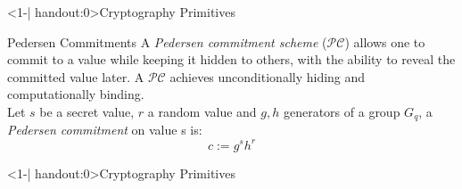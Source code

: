 \begin{frame}<1-| handout:0>{Cryptography Primitives}
    \begin{block}{Pedersen Commitments}
        A \emph{Pedersen commitment scheme} ($\mathcal{PC}$)  allows one to commit to a value while keeping it hidden to others, with the ability to reveal the committed value later. A $\mathcal{PC}$ achieves unconditionally hiding and computationally binding.\\
        Let $s$ be a secret value, $r$ a random value and $g,h$ generators of a group $G_q$, a \emph{Pedersen commitment} on value s is:
        $$c := g^s h^r$$
    \end{block}
\end{frame}

\begin{frame}<1-| handout:0>{Cryptography Primitives}
\end{frame}